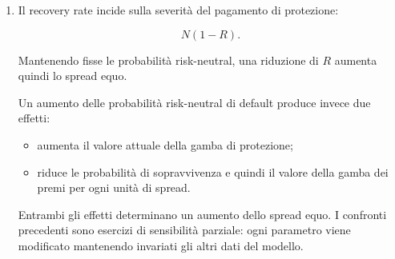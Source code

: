 \begin{enumerate}
\[
0.04,
\qquad
0.05,
\qquad
0.07.
\]

Le corrispondenti probabilit\`{a} di sopravvivenza sono:

\[
\Prob^{\Q}(\tau_D>1)=0.96,
\]

\[
\Prob^{\Q}(\tau_D>2)
=
1-0.04-0.05
=
0.91,
\]

e

\[
\Prob^{\Q}(\tau_D>3)
=
1-0.04-0.05-0.07
=
0.84.
\]

Il nuovo fattore della gamba di protezione \`{e}

\[
\begin{split}
A_{\mathrm{prot}}^{(2)}
&=
(0.98)(0.04)
+
(0.95)(0.05)
+
(0.92)(0.07)
\\
&=
0.0392+0.0475+0.0644
\\
&=
0.1511.
\end{split}
\]

Il fattore della gamba dei premi \`{e}

\[
\begin{split}
A_{\mathrm{prem}}^{(2)}
&=
(0.98)(0.96)
+
(0.95)(0.91)
+
(0.92)(0.84)
\\
&=
0.9408+0.8645+0.7728
\\
&=
2.5781.
\end{split}
\]

Con $R=0.40$:

\[
\begin{split}
s^{*}_{2}
&=
0.60
\frac{0.1511}{2.5781}
\\
&\approx
0.03517.
\end{split}
\]

Il nuovo spread equo \`{e} quindi

\[
\boxed{
s^{*}_{2}\approx351.7\text{ punti base}.
}
\]

\item Il recovery rate incide sulla severit\`{a} del pagamento di
protezione:

\[
N(1-R).
\]

Mantenendo fisse le probabilit\`{a} risk-neutral, una riduzione di $R$
aumenta quindi lo spread equo.

Un aumento delle probabilit\`{a} risk-neutral di default produce invece
due effetti:

\begin{itemize}

\item aumenta il valore attuale della gamba di protezione;

\item riduce le probabilit\`{a} di sopravvivenza e quindi il valore della
gamba dei premi per ogni unit\`{a} di spread.

\end{itemize}

Entrambi gli effetti determinano un aumento dello spread equo. I
confronti precedenti sono esercizi di sensibilit\`{a} parziale: ogni
parametro viene modificato mantenendo invariati gli altri dati del
modello.

\end{enumerate}

